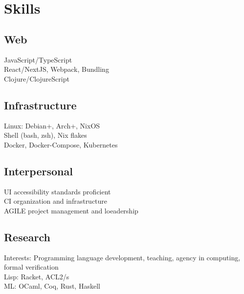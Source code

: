 \documentclass[letterpaper]{cv} %
\begin{document}
\begin{minipage}[t]{0.33\textwidth}
  \sectionspace


  \section{Skills}
  \subsection{Web}
  \textbullet{} JavaScript/TypeScript \\
  \textbullet{} React/NextJS, Webpack, Bundling \\
  \textbullet{} Clojure/ClojureScript \\
  \sectionspace
  \subsection{Infrastructure}
  \textbullet{} Linux: Debian+, Arch+, NixOS \\
  \textbullet{}Shell (bash, zsh), Nix flakes \\
  \textbullet{} Docker, Docker-Compose, Kubernetes \\

  \sectionspace
  \subsection{Interpersonal}
  \textbullet{} UI accessibility standards proficient \\
  \textbullet{} CI organization and infrastructure \\
  \textbullet{} AGILE project management and loeadership \\

  \sectionspace
  \subsection{Research}
  Interests: Programming language development,
  teaching, agency in computing, formal verification \\
  \textbullet{} Lisp: Racket, ACL2/s \\
  \textbullet{} ML: OCaml, Coq, Rust, Haskell \\
  \sectionspace

\end{minipage} %
\end{document}
